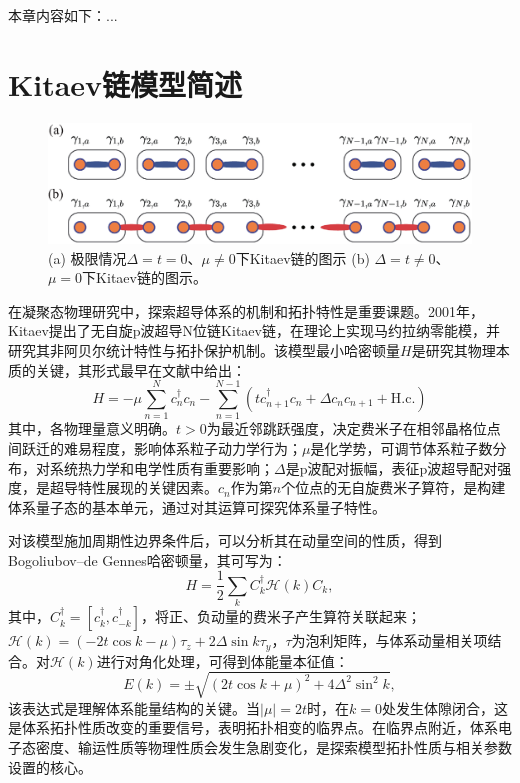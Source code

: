 本章内容如下：...

\section{Kitaev链模型简述}

\begin{figure}[h!]
    \centering
    \includegraphics[width=1\textwidth]{images/fig5-1.eps} 
    \caption{(a) 极限情况$\Delta = t = 0$、$\mu \neq 0$下Kitaev链的图示 (b) $\Delta = t \neq 0$、$\mu = 0$下Kitaev链的图示。}
    \label{fig_5_1}
\end{figure}

在凝聚态物理研究中，探索超导体系的机制和拓扑特性是重要课题。2001年，Kitaev提出了无自旋p波超导N位链Kitaev链，在理论上实现马约拉纳零能模，并研究其非阿贝尔统计特性与拓扑保护机制。该模型最小哈密顿量$H$是研究其物理本质的关键，其形式最早在文献\cite{C54}中给出：
\begin{equation}\label{eq5-1}
    H = -\mu \sum_{n = 1}^{N} c_{n}^{\dagger} c_{n} - \sum_{n = 1}^{N - 1} (t c_{n + 1}^{\dagger} c_{n} + \Delta c_{n} c_{n + 1} + \text{H.c.})
\end{equation}
其中，各物理量意义明确。$t > 0$为最近邻跳跃强度，决定费米子在相邻晶格位点间跃迁的难易程度，影响体系粒子动力学行为；$\mu$是化学势，可调节体系粒子数分布，对系统热力学和电学性质有重要影响；$\Delta$是p波配对振幅，表征p波超导配对强度，是超导特性展现的关键因素。$c_{n}$作为第$n$个位点的无自旋费米子算符，是构建体系量子态的基本单元，通过对其运算可探究体系量子特性。

对该模型施加周期性边界条件后，可以分析其在动量空间的性质，得到Bogoliubov–de Gennes哈密顿量，其可写为：
\begin{equation}\label{eq5-2}
    H = \frac{1}{2} \sum_{k} C_{k}^{\dagger} \mathcal{H}(k) C_{k},
\end{equation}
其中，$C_{k}^{\dagger} = [c_{k}^{\dagger}, c_{-k}^{\dagger}]$，将正、负动量的费米子产生算符关联起来；$\mathcal{H}(k) = (-2t \cos k - \mu) \tau_{z} + 2\Delta \sin k \tau_{y}$，$\tau$为泡利矩阵，与体系动量相关项结合。对$\mathcal{H}(k)$进行对角化处理，可得到体能量本征值：
\begin{equation}\label{eq5-3}
    E(k) = \pm \sqrt{(2t \cos k + \mu)^{2} + 4\Delta^{2} \sin^{2} k},
\end{equation}
该表达式是理解体系能量结构的关键。当$\vert \mu \vert = 2t$时，在$k = 0$处发生体隙闭合，这是体系拓扑性质改变的重要信号，表明拓扑相变的临界点。在临界点附近，体系电子态密度、输运性质等物理性质会发生急剧变化，是探索模型拓扑性质与相关参数设置的核心。

